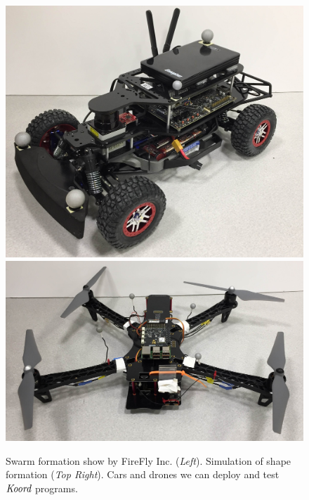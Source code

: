 \begin{figure}[h!]
\begin{minipage}{0.55\columnwidth}
	\includegraphics[width=0.42\linewidth]{figs/car.jpg}
	\includegraphics[width=0.56\linewidth]{figs/quad.jpg}
\end{minipage}%
	\caption{
        Swarm formation show by FireFly Inc. (\emph{Left}).
        Simulation of shape formation (\emph{Top Right}).
        Cars and drones we can deploy and test $\emph{Koord}$ programs.}
    \label{fig:firefly}
\end{figure}



